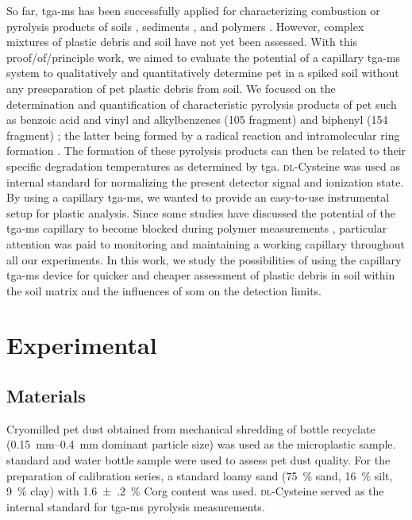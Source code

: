 So far, \ac{tga-ms} has been successfully applied for characterizing combustion or pyrolysis products of soils \citep{PallasserSoil2013,EdmondsonBlack2015,TamimiFate2017}, sediments \citep{FindorakovaAssessment2017}, and polymers \citep{PagaczThermal2015,SchindlerNovel2013}. However, complex mixtures of plastic debris and soil have not yet been assessed.
With this proof\-/of\-/principle work, we aimed to evaluate the potential of a capillary \ac{tga-ms} system to qualitatively and quantitatively determine \ac{pet} in a spiked soil without any preseparation of \ac{pet} plastic debris from soil.
We focused on the determination and quantification of characteristic pyrolysis products of \ac{pet} such as benzoic acid and vinyl and alkylbenzenes (\SI{105}{\mz} fragment) and biphenyl (\SI{154}{\mz} fragment) \citep{DumichenFast2017,DimitrovAnalysis2013,DuemichenAssessment2014}; the latter being formed by a radical reaction and intramolecular ring formation \citep{RichterFormation2000,KawaiCharacterization2008}.
The formation of these pyrolysis products can then be related to their specific degradation temperatures as determined by \ac{tga}. \textsc{dl}-Cysteine was used as internal standard for normalizing the present detector signal and ionization state.
By using a capillary \ac{tga-ms}, we wanted to provide an easy-to-use instrumental setup for plastic analysis. Since some studies have discussed the potential of the \ac{tga-ms} capillary to become blocked during polymer measurements \citep{SchindlerNovel2013,DuemichenAssessment2014}, particular attention was paid to monitoring and maintaining a working capillary throughout all our experiments.
In this work, we study the possibilities of using the capillary \ac{tga-ms} device for quicker and cheaper assessment of plastic debris in soil within the soil matrix and the influences of \ac{som} on the detection limits.

\section{Experimental}

\subsection{Materials}

Cryomilled \ac{pet} dust obtained from mechanical shredding of bottle recyclate (\SIrange{0.15}{0.4}{\milli\meter} dominant particle size) was used as the microplastic sample.  standard and  water bottle sample were used to assess \ac{pet} dust quality.
For the preparation of calibration series, a standard loamy sand (\SI{75}{\percent} sand, \SI{16}{\percent} silt, \SI{9}{\percent} clay) with \SI{1.6(2)}{\percent} \ac{Corg} content was used. \textsc{dl}-Cysteine served as the internal standard for \ac{tga-ms} pyrolysis measurements.

